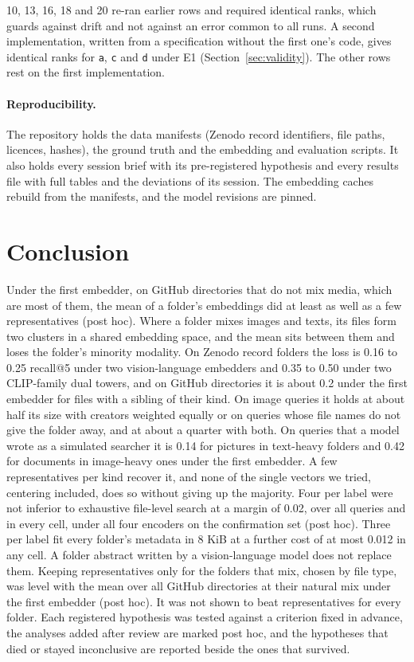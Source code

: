 \documentclass[11pt]{article}
\newcommand{\rep}[1]{\texttt{#1}}
\begin{document}
10, 13, 16, 18 and 20 re-ran earlier rows and required identical ranks, which guards against drift and not against an error common to all runs. A second implementation, written from a specification without the first one's code, gives identical ranks for \rep{a}, \rep{c} and \rep{d} under E1 (Section~\ref{sec:validity}). The other rows rest on the first implementation.

\paragraph{Reproducibility.} The repository holds the data manifests (Zenodo record identifiers, file paths, licences, hashes), the ground truth and the embedding and evaluation scripts. It also holds every session brief with its pre-registered hypothesis and every results file with full tables and the deviations of its session. The embedding caches rebuild from the manifests, and the model revisions are pinned.

\section{Conclusion}

Under the first embedder, on GitHub directories that do not mix media, which are most of them, the mean of a folder's embeddings did at least as well as a few representatives (post hoc). Where a folder mixes images and texts, its files form two clusters in a shared embedding space, and the mean sits between them and loses the folder's minority modality. On Zenodo record folders the loss is 0.16 to 0.25 recall@5 under two vision-language embedders and 0.35 to 0.50 under two CLIP-family dual towers, and on GitHub directories it is about 0.2 under the first embedder for files with a sibling of their kind. On image queries it holds at about half its size with creators weighted equally or on queries whose file names do not give the folder away, and at about a quarter with both. On queries that a model wrote as a simulated searcher it is 0.14 for pictures in text-heavy folders and 0.42 for documents in image-heavy ones under the first embedder. A few representatives per kind recover it, and none of the single vectors we tried, centering included, does so without giving up the majority. Four per label were not inferior to exhaustive file-level search at a margin of 0.02, over all queries and in every cell, under all four encoders on the confirmation set (post hoc). Three per label fit every folder's metadata in 8 KiB at a further cost of at most 0.012 in any cell. A folder abstract written by a vision-language model does not replace them. Keeping representatives only for the folders that mix, chosen by file type, was level with the mean over all GitHub directories at their natural mix under the first embedder (post hoc). It was not shown to beat representatives for every folder. Each registered hypothesis was tested against a criterion fixed in advance, the analyses added after review are marked post hoc, and the hypotheses that died or stayed inconclusive are reported beside the ones that survived.
\end{document}
